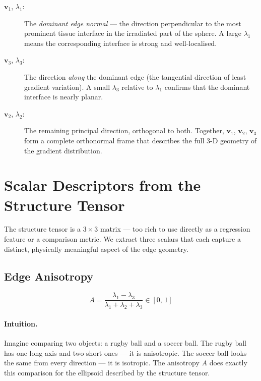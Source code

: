 \documentclass[11pt,a4paper]{article}
\newcommand{\vv}{\mathbf{v}}
\begin{document}
\begin{description}
    \item[$\vv_1$, $\lambda_1$:]
        The \emph{dominant edge normal} — the direction perpendicular to the
        most prominent tissue interface in the irradiated part of the sphere.
        A large $\lambda_1$ means the corresponding interface is strong and
        well-localised.

    \item[$\vv_3$, $\lambda_3$:]
        The direction \emph{along} the dominant edge (the tangential
        direction of least gradient variation).
        A small $\lambda_3$ relative to $\lambda_1$ confirms that the dominant
        interface is nearly planar.

    \item[$\vv_2$, $\lambda_2$:]
        The remaining principal direction, orthogonal to both.
        Together, $\vv_1$, $\vv_2$, $\vv_3$ form a complete orthonormal
        frame that describes the full 3-D geometry of the gradient
        distribution.
\end{description}

\section{Scalar Descriptors from the Structure Tensor}
\label{sec:scalar}

The structure tensor is a $3\times3$ matrix — too rich to use directly as a
regression feature or a comparison metric.
We extract three scalars that each capture a distinct, physically meaningful
aspect of the edge geometry.

\subsection{Edge Anisotropy}

\begin{equation}
    \boxed{A = \frac{\lambda_1 - \lambda_3}{\lambda_1 + \lambda_2 + \lambda_3}}
    \in [0,\,1]
    \label{eq:anisotropy}
\end{equation}

\paragraph{Intuition.}
Imagine comparing two objects: a rugby ball and a soccer ball.
The rugby ball has one long axis and two short ones — it is anisotropic.
The soccer ball looks the same from every direction — it is isotropic.
The anisotropy $A$ does exactly this comparison for the ellipsoid described
by the structure tensor.
\end{document}
